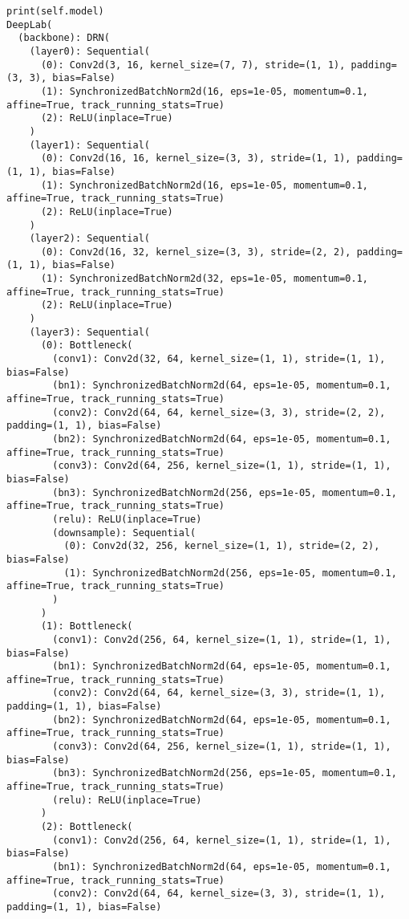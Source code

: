 \begin{verbatim}
print(self.model)
DeepLab(
  (backbone): DRN(
    (layer0): Sequential(
      (0): Conv2d(3, 16, kernel_size=(7, 7), stride=(1, 1), padding=(3, 3), bias=False)
      (1): SynchronizedBatchNorm2d(16, eps=1e-05, momentum=0.1, affine=True, track_running_stats=True)
      (2): ReLU(inplace=True)
    )
    (layer1): Sequential(
      (0): Conv2d(16, 16, kernel_size=(3, 3), stride=(1, 1), padding=(1, 1), bias=False)
      (1): SynchronizedBatchNorm2d(16, eps=1e-05, momentum=0.1, affine=True, track_running_stats=True)
      (2): ReLU(inplace=True)
    )
    (layer2): Sequential(
      (0): Conv2d(16, 32, kernel_size=(3, 3), stride=(2, 2), padding=(1, 1), bias=False)
      (1): SynchronizedBatchNorm2d(32, eps=1e-05, momentum=0.1, affine=True, track_running_stats=True)
      (2): ReLU(inplace=True)
    )
    (layer3): Sequential(
      (0): Bottleneck(
        (conv1): Conv2d(32, 64, kernel_size=(1, 1), stride=(1, 1), bias=False)
        (bn1): SynchronizedBatchNorm2d(64, eps=1e-05, momentum=0.1, affine=True, track_running_stats=True)
        (conv2): Conv2d(64, 64, kernel_size=(3, 3), stride=(2, 2), padding=(1, 1), bias=False)
        (bn2): SynchronizedBatchNorm2d(64, eps=1e-05, momentum=0.1, affine=True, track_running_stats=True)
        (conv3): Conv2d(64, 256, kernel_size=(1, 1), stride=(1, 1), bias=False)
        (bn3): SynchronizedBatchNorm2d(256, eps=1e-05, momentum=0.1, affine=True, track_running_stats=True)
        (relu): ReLU(inplace=True)
        (downsample): Sequential(
          (0): Conv2d(32, 256, kernel_size=(1, 1), stride=(2, 2), bias=False)
          (1): SynchronizedBatchNorm2d(256, eps=1e-05, momentum=0.1, affine=True, track_running_stats=True)
        )
      )
      (1): Bottleneck(
        (conv1): Conv2d(256, 64, kernel_size=(1, 1), stride=(1, 1), bias=False)
        (bn1): SynchronizedBatchNorm2d(64, eps=1e-05, momentum=0.1, affine=True, track_running_stats=True)
        (conv2): Conv2d(64, 64, kernel_size=(3, 3), stride=(1, 1), padding=(1, 1), bias=False)
        (bn2): SynchronizedBatchNorm2d(64, eps=1e-05, momentum=0.1, affine=True, track_running_stats=True)
        (conv3): Conv2d(64, 256, kernel_size=(1, 1), stride=(1, 1), bias=False)
        (bn3): SynchronizedBatchNorm2d(256, eps=1e-05, momentum=0.1, affine=True, track_running_stats=True)
        (relu): ReLU(inplace=True)
      )
      (2): Bottleneck(
        (conv1): Conv2d(256, 64, kernel_size=(1, 1), stride=(1, 1), bias=False)
        (bn1): SynchronizedBatchNorm2d(64, eps=1e-05, momentum=0.1, affine=True, track_running_stats=True)
        (conv2): Conv2d(64, 64, kernel_size=(3, 3), stride=(1, 1), padding=(1, 1), bias=False)

\end{verbatim}
